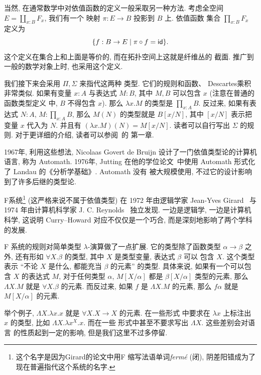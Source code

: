 
当然, 在通常数学中对依值函数的定义一般采取另一种方法.
考虑全空间 \(E = \coprod_{x:B} F_x\), 我们有一个
映射 \(\pi : E \to B\) 投影到 \(B\) 上. 依值函数
集合 \(\prod_{x:B} F_x\) 定义为
\[\{f : B \to E \mid \pi \circ f = \textsf{id}\}.\]
这个定义在集合上和上面是等价的, 而在拓扑空间上这就是纤维丛的
截面. 推广到一般的数学对象上时, 也采用这个定义.

我们接下来会采用 \(\Pi, \Sigma\) 来指代这两种
类型. 它们的规则和函数、 Descartes乘积非常类似.
如果有变量 \(x : A\) 与表达式 \(M : B\), 其中
\(M, B\) 可以包含 \(x\) (注意在普通的函数类型定义
中, \(B\) 不得包含 \(x\)).
那么 \(\lambda x. M\) 的类型是 \(\prod_{x:A}B\).
反过来,
如果有表达式 \(N : A\), \(M : \prod_{x:A} B\),
那么 \(M(N)\) 的类型就是 \(B[x/N]\), 其中 \([x/N]\)
表示把变量 \(x\) 代入为 \(N\). 并且有 \((\lambda x.M)(N) = M[x/N]\).
读者可以自行写出 \(\Sigma\) 的规则. %
对于更详细的介绍, 读者可以参阅\cite{ufp:2013:hottbook}~的
第一章.

1967年, 利用这些想法, Nicolaas Govert de Bruijn
设计了一门依值类型论的计算机语言, 称为 Automath.
1976年, Jutting 在他的学位论文~\cite{automath:1994:automath}中使用 Automath
形式化了 Landau 的《分析学基础》. Automath 没有
被大规模使用, 不过它的设计影响到了许多后继的类型论.

F系统\footnote{这个名字是因为Girard的论文中用F
缩写法语单词\emph{ferm\'e} (闭), 阴差阳错成为了
现在普遍指代这个系统的名字.} (这严格来说不属于依值类型)
在 1972 年由逻辑学家 Jean-Yves Girard~\cite{girard:1972:systemf}
与 1974 年由计算机科学家 J. C. Reynolds~\cite{reynolds:1974:systemf} 独立发现.
一边是逻辑学, 一边是计算机科学, 这说明 Curry--Howard
对应不仅仅是一个巧合, 而是深刻地影响了两个学科的发展.

F 系统的规则对简单类型 \(\lambda\)-演算做了一点扩展.
它的类型除了函数类型 \(\alpha \to \beta\) 之外,
还有形如 \(\forall X. \beta\) 的类型, 其中
\(X\) 是类型变量, 表达式 \(\beta\) 可以
包含 \(X\). 这个类型表示 “不论 \(X\) 是什么,
都能充当 \(\beta\) 的元素” 的类型. 具体来说,
如果有一个可以包含 \(X\) 的表达式 \(M\),
对于任何类型 \(\alpha\), \(M[X/\alpha]\) 都是
\(\beta[X/\alpha]\) 类型的元素, 那么
\(\Lambda X. M\) 就是 \(\forall X. \beta\) 的元素.
而反过来, 如果 \(f\) 是 \(\Lambda X. M\) 的元素,
那么 \(f \alpha\) 就是 \(M[X/\alpha]\) 的元素.

举个例子, \(\Lambda X. \lambda x. x\)
就是 \(\forall X. X \to X\) 的元素. 在一些形式
中要求在 \(\lambda x\) 上标注出 \(x\) 的类型,
比如 \(\Lambda X. \lambda x^X. x\). 而在一些
形式中甚至不要求写出 \(\Lambda X\). 这些差别会对语言
的性质起到一定的影响, 但是我们这里不过多停留.

